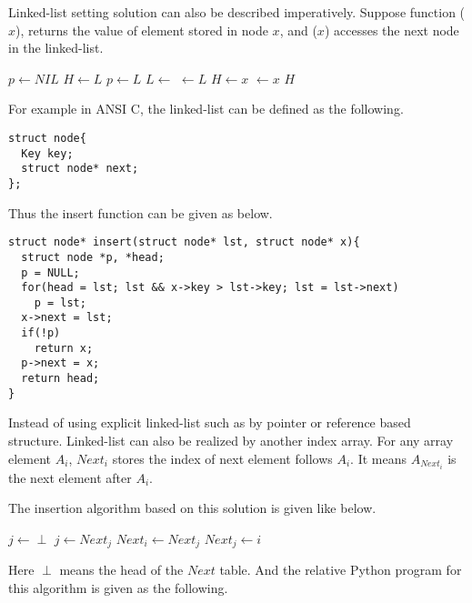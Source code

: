 \documentclass{article}
\begin{document}
Linked-list setting solution can also be described imperatively. Suppose
function ($x$), returns the value of element stored in node
$x$, and ($x$) accesses the next node in the linked-list.

\begin{algorithmic}
  \State $p \gets NIL$
  \State $H \gets L$
    \State $p \gets L$
    \State $L \gets $ 
  \EndWhile
  \State {} $\gets L$
    \State $H \gets x$
  \Else
    \State {} $\gets x$
  \EndIf
  \State \Return $H$
\EndFunction
\end{algorithmic}

For example in ANSI C, the linked-list can be defined as the following.

\lstset{language=C}
\begin{lstlisting}
struct node{
  Key key;
  struct node* next;
};
\end{lstlisting}

Thus the insert function can be given as below.

\begin{lstlisting}
struct node* insert(struct node* lst, struct node* x){
  struct node *p, *head;
  p = NULL;
  for(head = lst; lst && x->key > lst->key; lst = lst->next)
    p = lst;
  x->next = lst;
  if(!p)
    return x;
  p->next = x;
  return head;
}
\end{lstlisting}

Instead of using explicit linked-list such as by pointer or reference
based structure. Linked-list can also be realized by another index array.
For any array element $A_i$, $Next_i$ stores the index of next element
follows $A_i$. It means $A_{Next_i}$ is the next element after $A_i$.

The insertion algorithm based on this solution is given like below.

\begin{algorithmic}
  \State $j \gets \perp$
    \State $j \gets Next_j$
  \EndWhile
  \State $Next_i \gets Next_j$
  \State $Next_j \gets i$
\EndFunction
\end{algorithmic}

Here $\perp$ means the head of the $Next$ table. 
And the relative Python program for this algorithm is given as the following.
\end{document}
